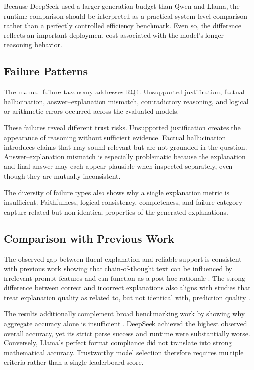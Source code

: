 \documentclass{article}
\begin{document}
Because DeepSeek used a larger generation budget than Qwen and Llama,
the runtime comparison should be interpreted as a practical
system-level comparison rather than a perfectly controlled efficiency
benchmark. Even so, the difference reflects an important deployment
cost associated with the model's longer reasoning behavior.

\subsection{Failure Patterns}

The manual failure taxonomy addresses RQ4. Unsupported justification,
factual hallucination, answer--explanation mismatch, contradictory
reasoning, and logical or arithmetic errors occurred across the
evaluated models.

These failures reveal different trust risks. Unsupported justification
creates the appearance of reasoning without sufficient evidence.
Factual hallucination introduces claims that may sound relevant but are
not grounded in the question. Answer--explanation mismatch is especially
problematic because the explanation and final answer may each appear
plausible when inspected separately, even though they are mutually
inconsistent.

The diversity of failure types also shows why a single explanation
metric is insufficient. Faithfulness, logical consistency, completeness,
and failure category capture related but non-identical properties of
the generated explanations.

\subsection{Comparison with Previous Work}

The observed gap between fluent explanation and reliable support is
consistent with previous work showing that chain-of-thought text can be
influenced by irrelevant prompt features and can function as a post-hoc
rationale
\cite{turpin2023language,lanham2023measuring}. The strong difference
between correct and incorrect explanations also aligns with studies
that treat explanation quality as related to, but not identical with,
prediction quality
\cite{madsen2024selfexplanations,paul2024making}.

The results additionally complement broad benchmarking work by showing
why aggregate accuracy alone is insufficient
\cite{liang2023helm}. DeepSeek achieved the highest observed overall
accuracy, yet its strict parse success and runtime were substantially
worse. Conversely, Llama's perfect format compliance did not translate
into strong mathematical accuracy. Trustworthy model selection
therefore requires multiple criteria rather than a single leaderboard
score.
\end{document}
